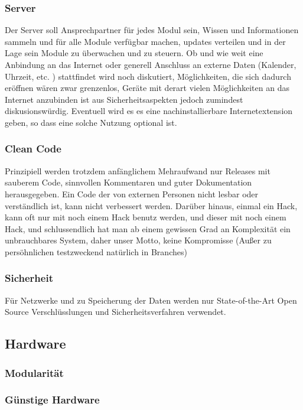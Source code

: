 \documentclass[11pt]{amsart}
\begin{document}
\subsubsection{Server}
Der Server soll Ansprechpartner f\"ur jedes Modul sein, Wissen und Informationen sammeln und f\"ur alle Module verf\"ugbar machen, updates verteilen und in der Lage sein Module zu \"uberwachen und zu steuern. Ob und wie weit eine Anbindung an das Internet oder generell Anschluss an externe Daten (Kalender, Uhrzeit, etc. ) stattfindet wird noch diskutiert, M\"oglichkeiten, die sich dadurch er\"offnen w\"aren zwar grenzenlos, Ger\"ate mit derart vielen M\"oglichkeiten an das Internet anzubinden ist aus Sicherheitsaspekten jedoch zumindest diskusionsw\"urdig. Eventuell wird es es eine nachinstallierbare Internetextension geben, so dass eine solche Nutzung optional ist. 
\subsubsection{Clean Code}
Prinzipiell werden trotzdem anf\"anglichem Mehraufwand nur Releases mit sauberem Code, sinnvollen Kommentaren und guter Dokumentation herausgegeben. Ein Code der von externen Personen nicht lesbar oder verst\"andlich ist, kann nicht verbessert werden. Dar\"uber hinaus, einmal ein Hack, kann oft nur mit noch einem Hack benutz werden, und dieser mit noch einem Hack, und schlussendlich hat man ab einem gewissen Grad an Komplexit\"at ein unbrauchbares System, daher unser Motto, keine Kompromisse (Au\ss{}er zu pers\"ohnlichen testzweckend nat\"urlich in Branches)
\subsubsection{Sicherheit}
F\"ur Netzwerke und zu Speicherung der Daten werden nur State-of-the-Art Open Source Verschl\"usslungen und Sicherheitsverfahren verwendet.

\subsection{Hardware}
\subsubsection{Modularit\"at}
\subsubsection{G\"unstige Hardware}
\end{document}
